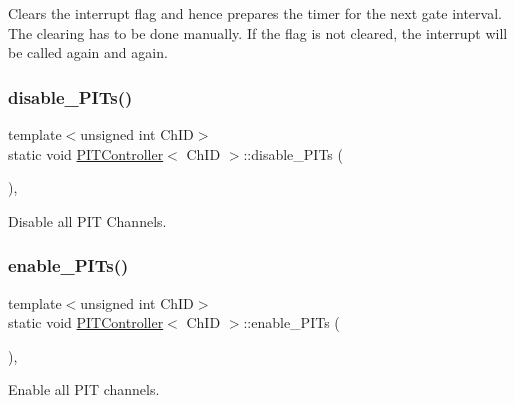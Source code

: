 Clears the interrupt flag and hence prepares the timer for the next gate interval. The clearing has to be done manually. If the flag is not cleared, the interrupt will be called again and again. 

\mbox{\label{classPITController_a5e1bf9f8053a51c68f0ff2178ab56954}} 
\subsubsection{\texorpdfstring{disable\+\_\+\+P\+I\+Ts()}{disable\_PITs()}}
{\footnotesize\ttfamily template$<$unsigned int Ch\+ID$>$ \\
static void \hyperlink{classPITController}{P\+I\+T\+Controller}$<$ Ch\+ID $>$\+::disable\+\_\+\+P\+I\+Ts (\begin{DoxyParamCaption}{ }\end{DoxyParamCaption})\hspace{0.3cm}{\ttfamily [inline]}, {\ttfamily [static]}}



Disable all P\+IT Channels. 

\mbox{\label{classPITController_aa742977692efbc075b52a5dbd6533230}} 
\subsubsection{\texorpdfstring{enable\+\_\+\+P\+I\+Ts()}{enable\_PITs()}}
{\footnotesize\ttfamily template$<$unsigned int Ch\+ID$>$ \\
static void \hyperlink{classPITController}{P\+I\+T\+Controller}$<$ Ch\+ID $>$\+::enable\+\_\+\+P\+I\+Ts (\begin{DoxyParamCaption}{ }\end{DoxyParamCaption})\hspace{0.3cm}{\ttfamily [inline]}, {\ttfamily [static]}}



Enable all P\+IT channels. 

\mbox{\label{classPITController_a7cb352b2deb5bba48b8e2f0671a66801}} 
